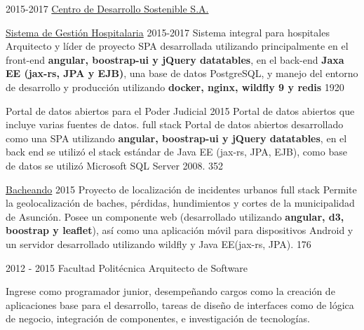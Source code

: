 \documentclass[]{friggeri-cv}
\begin{document}
\begin{entrylist}
{      }
      {}
   
  \entry
    {2015-2017}
    {\href{http://www.cds.com.py}{Centro de Desarrollo Sostenible S.A.}}
    {}
    {
        
    \proyecto
        {\href{http://www.cds.com.py/productos/sistemas-de-gestion/sistema-de-gestion-hospitalaria/}{Sistema de Gestión Hospitalaria}}
        {2015-2017}
        {Sistema integral para hospitales}
        {Arquitecto y líder de proyecto}
        {SPA desarrollada utilizando principalmente en el front-end 
        \textbf{angular, boostrap-ui y jQuery datatables}, en el back-end 
        \textbf{Jaxa EE (jax-rs, JPA y EJB)}, una base de datos PostgreSQL, 
        y manejo del entorno de desarrollo y producción utilizando 
        \textbf{docker, nginx, wildfly 9 y redis}}
        {1920}
        
    \proyecto
        {Portal de datos abiertos para el Poder Judicial}
        {2015}
        {Portal de datos abiertos que incluye varias fuentes de datos.}
        {full stack}
        {Portal de datos abiertos desarrollado como una SPA utilizando 
        \textbf{angular, boostrap-ui y jQuery datatables}, en el back end 
        se utilizó el stack estándar de Java EE (jax-rs, JPA, EJB), como base 
        de datos se utilizó Microsoft SQL Server 2008.}
        {352} 
        
    \proyecto
        {\href{http://bacheando.com/}{Bacheando}}
        {2015}
        {Proyecto de localización de incidentes urbanos}
        {full stack}
        {Permite la geolocalización de baches, pérdidas, hundimientos y
            cortes de la municipalidad de Asunción.
            Posee un componente web (desarrollado utilizando 
            \textbf{angular, d3, boostrap y leaflet}), así como una 
            aplicación móvil para dispositivos Android y un servidor desarrollado 
            utilizando wildfly y Java EE(jax-rs, JPA).}
        {176} 
        
	}
    {}


\entry
    {2012 - 2015}
    {Facultad Politécnica}
    {Arquitecto de Software}
    {Ingrese como programador junior, desempeñando cargos como la creación de
        aplicaciones base para el desarrollo, tareas de diseño de interfaces
        como de lógica de negocio, integración de componentes, e investigación
        de tecnologías.

}
\end{entrylist}
\end{document}
